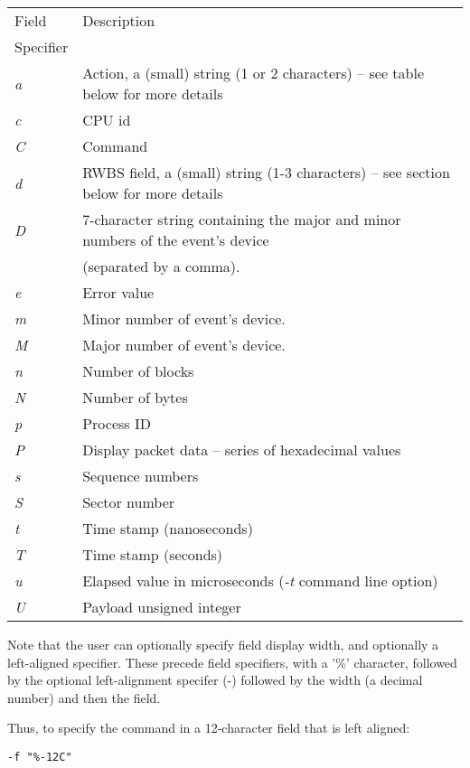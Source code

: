 \documentclass{article}
\begin{document}
\smallskip
\begin{tabular}{|l|l|}\hline
Field    & Description \\
Specifier & \\ \hline\hline
\emph{a} & Action, a (small) string (1 or 2 characters) -- see table below for more details \\ \hline
\emph{c} & CPU id \\ \hline
\emph{C} & Command \\ \hline
\emph{d} & RWBS field, a (small) string (1-3 characters)  -- see section below for more details \\ \hline
\emph{D} & 7-character string containing the major and minor numbers of
the event's device \\
         & (separated by a comma). \\ \hline
\emph{e} & Error value \\ \hline
\emph{m} & Minor number of event's device. \\ \hline
\emph{M} & Major number of event's device. \\ \hline
\emph{n} & Number of blocks \\ \hline
\emph{N} & Number of bytes \\ \hline
\emph{p} & Process ID \\ \hline
\emph{P} & Display packet data -- series of hexadecimal values\\ \hline
\emph{s} & Sequence numbers \\ \hline
\emph{S} & Sector number \\ \hline
\emph{t} & Time stamp (nanoseconds) \\ \hline
\emph{T} & Time stamp (seconds) \\ \hline
\emph{u} & Elapsed value in microseconds (\emph{-t} command line option) \\ \hline
\emph{U} & Payload unsigned integer \\ \hline
\end{tabular}

Note that the user can optionally specify field display width, and
optionally a left-aligned specifier. These precede field specifiers,
with a '\%' character, followed by the optional left-alignment specifer
(-) followed by the width (a decimal number) and then the field.

Thus, to specify the command in a 12-character field that is left aligned:

\begin{verbatim}
-f "%-12C"
\end{verbatim}
\end{document}
